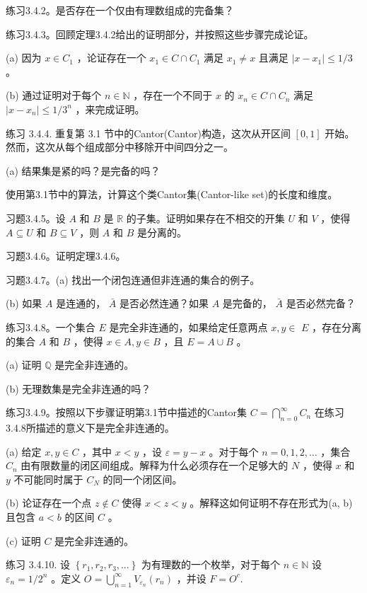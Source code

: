 练习3.4.2。是否存在一个仅由有理数组成的完备集？

练习3.4.3。回顾定理3.4.2给出的证明部分，并按照这些步骤完成论证。

(a) 因为 \(x \in  {C}_{1}\) ，论证存在一个 \({x}_{1} \in  C \cap  {C}_{1}\) 满足 \({x}_{1} \neq  x\) 且满足 \(\left| {x - {x}_{1}}\right|  \leq  1/3\) 。

(b) 通过证明对于每个 \(n \in  \mathbb{N}\) ，存在一个不同于 \(x\) 的 \({x}_{n} \in  C \cap  {C}_{n}\) 满足 \(\left| {x - {x}_{n}}\right|  \leq  1/{3}^{n}\) ，来完成证明。

练习 3.4.4. 重复第 3.1 节中的Cantor(Cantor)构造，这次从开区间 \(\left\lbrack  {0,1}\right\rbrack\) 开始。然而，这次从每个组成部分中移除开中间四分之一。

(a) 结果集是紧的吗？是完备的吗？

使用第3.1节中的算法，计算这个类Cantor集(Cantor-like set)的长度和维度。

习题3.4.5。设 \(A\) 和 \(B\) 是 \(\mathbb{R}\) 的子集。证明如果存在不相交的开集 \(U\) 和 \(V\) ，使得 \(A \subseteq  U\) 和 \(B \subseteq  V\) ，则 \(A\) 和 \(B\) 是分离的。

习题3.4.6。证明定理3.4.6。

习题3.4.7。(a) 找出一个闭包连通但非连通的集合的例子。

(b) 如果 \(A\) 是连通的， \(\bar{A}\) 是否必然连通？如果 \(A\) 是完备的， \(\bar{A}\) 是否必然完备？

练习3.4.8。一个集合 \(E\) 是完全非连通的，如果给定任意两点 \(x,y \in\)  \(E\) ，存在分离的集合 \(A\) 和 \(B\) ，使得 \(x \in  A,y \in  B\) ，且 \(E = A \cup  B\) 。

(a) 证明 \(\mathbb{Q}\) 是完全非连通的。

(b) 无理数集是完全非连通的吗？

练习3.4.9。按照以下步骤证明第3.1节中描述的Cantor集 \(C = \mathop{\bigcap }\limits_{{n = 0}}^{\infty }{C}_{n}\) 在练习3.4.8所描述的意义下是完全非连通的。

(a) 给定 \(x,y \in  C\) ，其中 \(x < y\) ，设 \(\varepsilon  = y - x\) 。对于每个 \(n = 0,1,2,\ldots\) ，集合 \({C}_{n}\) 由有限数量的闭区间组成。解释为什么必须存在一个足够大的 \(N\) ，使得 \(x\) 和 \(y\) 不可能同时属于 \({C}_{N}\) 的同一个闭区间。

(b) 论证存在一个点 \(z \notin  C\) 使得 \(x < z < y\) 。解释这如何证明不存在形式为(a, b)且包含 \(a < b\) 的区间 \(C\) 。

(c) 证明 \(C\) 是完全非连通的。

练习 3.4.10. 设 \(\left\{  {{r}_{1},{r}_{2},{r}_{3},\ldots }\right\}\) 为有理数的一个枚举，对于每个 \(n \in  \mathbb{N}\) 设 \({\varepsilon }_{n} = 1/{2}^{n}\) 。定义 \(O = \mathop{\bigcup }\limits_{{n = 1}}^{\infty }{V}_{{\varepsilon }_{n}}\left( {r}_{n}\right)\) ，并设 \(F = {O}^{c}.\)

